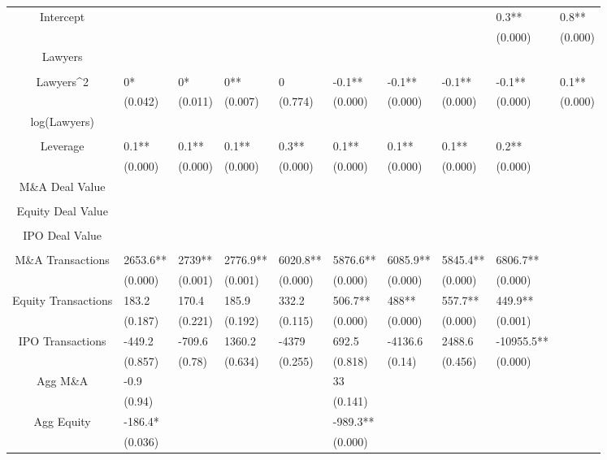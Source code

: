 \documentclass{article}
\begin{document}
\begin{table}[H]
\begin{tabular}{|clllllllll|}
Intercept &  &  &  &  &  &  &  & 0.3** & 0.8** \\ 
   &  &  &  &  &  &  &  & (0.000) & (0.000) \\ 
  Lawyers &  &  &  &  &  &  &  &  &  \\ 
   &  &  &  &  &  &  &  &  &  \\ 
  Lawyers^2 & 0* & 0* & 0** & 0 & -0.1** & -0.1** & -0.1** & -0.1** & 0.1** \\ 
   & (0.042) & (0.011) & (0.007) & (0.774) & (0.000) & (0.000) & (0.000) & (0.000) & (0.000) \\ 
  log(Lawyers) &  &  &  &  &  &  &  &  &  \\ 
   &  &  &  &  &  &  &  &  &  \\ 
  Leverage & 0.1** & 0.1** & 0.1** & 0.3** & 0.1** & 0.1** & 0.1** & 0.2** &  \\ 
   & (0.000) & (0.000) & (0.000) & (0.000) & (0.000) & (0.000) & (0.000) & (0.000) &  \\ 
  M\&A Deal Value &  &  &  &  &  &  &  &  &  \\ 
   &  &  &  &  &  &  &  &  &  \\ 
  Equity Deal Value &  &  &  &  &  &  &  &  &  \\ 
   &  &  &  &  &  &  &  &  &  \\ 
  IPO Deal Value &  &  &  &  &  &  &  &  &  \\ 
   &  &  &  &  &  &  &  &  &  \\ 
  M\&A Transactions & 2653.6** & 2739** & 2776.9** & 6020.8** & 5876.6** & 6085.9** & 5845.4** & 6806.7** &  \\ 
   & (0.000) & (0.001) & (0.001) & (0.000) & (0.000) & (0.000) & (0.000) & (0.000) &  \\ 
  Equity Transactions & 183.2 & 170.4 & 185.9 & 332.2 & 506.7** & 488** & 557.7** & 449.9** &  \\ 
   & (0.187) & (0.221) & (0.192) & (0.115) & (0.000) & (0.000) & (0.000) & (0.001) &  \\ 
  IPO Transactions & -449.2 & -709.6 & 1360.2 & -4379 & 692.5 & -4136.6 & 2488.6 & -10955.5** &  \\ 
   & (0.857) & (0.78) & (0.634) & (0.255) & (0.818) & (0.14) & (0.456) & (0.000) &  \\ 
  Agg M\&A & -0.9 &  &  &  & 33 &  &  &  &  \\ 
   & (0.94) &  &  &  & (0.141) &  &  &  &  \\ 
  Agg Equity & -186.4* &  &  &  & -989.3** &  &  &  &  \\ 
   & (0.036) &  &  &  & (0.000) &  &  &  &  \\ 

\end{tabular}
\end{table}
\end{document}
